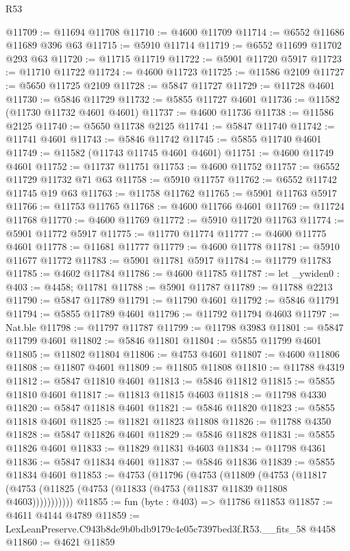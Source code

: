 \begin{lexlean}{R53}
\begin{coremodule}
@11709 := @11694 @11708
@11710 := @4600 @11709
@11714 := @6552 @11686 @11689 @396 @63
@11715 := @5910 @11714
@11719 := @6552 @11699 @11702 @293 @63
@11720 := @11715 @11719
@11722 := @5901 @11720 @5917
@11723 := @11710 @11722
@11724 := @4600 @11723
@11725 := @11586 @2109
@11727 := @5650 @11725 @2109
@11728 := @5847 @11727
@11729 := @11728 @4601
@11730 := @5846 @11729
@11732 := @5855 @11727 @4601
@11736 := @11582 (@11730 @11732 @4601 @4601)
@11737 := @4600 @11736
@11738 := @11586 @2125
@11740 := @5650 @11738 @2125
@11741 := @5847 @11740
@11742 := @11741 @4601
@11743 := @5846 @11742
@11745 := @5855 @11740 @4601
@11749 := @11582 (@11743 @11745 @4601 @4601)
@11751 := @4600 @11749 @4601
@11752 := @11737 @11751
@11753 := @4600 @11752
@11757 := @6552 @11729 @11732 @71 @63
@11758 := @5910 @11757
@11762 := @6552 @11742 @11745 @19 @63
@11763 := @11758 @11762
@11765 := @5901 @11763 @5917
@11766 := @11753 @11765
@11768 := @4600 @11766 @4601
@11769 := @11724 @11768
@11770 := @4600 @11769
@11772 := @5910 @11720 @11763
@11774 := @5901 @11772 @5917
@11775 := @11770 @11774
@11777 := @4600 @11775 @4601
@11778 := @11681 @11777
@11779 := @4600 @11778
@11781 := @5910 @11677 @11772
@11783 := @5901 @11781 @5917
@11784 := @11779 @11783
@11785 := @4602 @11784
@11786 := @4600 @11785
@11787 := let _ywiden0 : @403 := @4458; @11781
@11788 := @5901 @11787
@11789 := @11788 @2213
@11790 := @5847 @11789
@11791 := @11790 @4601
@11792 := @5846 @11791
@11794 := @5855 @11789 @4601
@11796 := @11792 @11794 @4603
@11797 := Nat.ble
@11798 := @11797 @11787
@11799 := @11798 @3983
@11801 := @5847 @11799 @4601
@11802 := @5846 @11801
@11804 := @5855 @11799 @4601
@11805 := @11802 @11804
@11806 := @4753 @4601
@11807 := @4600 @11806
@11808 := @11807 @4601
@11809 := @11805 @11808
@11810 := @11788 @4319
@11812 := @5847 @11810 @4601
@11813 := @5846 @11812
@11815 := @5855 @11810 @4601
@11817 := @11813 @11815 @4603
@11818 := @11798 @4330
@11820 := @5847 @11818 @4601
@11821 := @5846 @11820
@11823 := @5855 @11818 @4601
@11825 := @11821 @11823 @11808
@11826 := @11788 @4350
@11828 := @5847 @11826 @4601
@11829 := @5846 @11828
@11831 := @5855 @11826 @4601
@11833 := @11829 @11831 @4603
@11834 := @11798 @4361
@11836 := @5847 @11834 @4601
@11837 := @5846 @11836
@11839 := @5855 @11834 @4601
@11853 := @4753
    (@11796
      (@4753
        (@11809
          (@4753 (@11817 (@4753 (@11825 (@4753 (@11833 (@4753 (@11837 @11839 @11808 @4603)))))))))))
@11855 := fun (byte : @403) => @11786 @11853
@11857 := @4611 @4144 @4789
@11859 := LexLeanPreserve.C943b8de9b0bdb9179c4e05c7397bed3f.R53.__fits_58 @4458
@11860 := @4621 @11859

\end{coremodule}
\end{lexlean}
